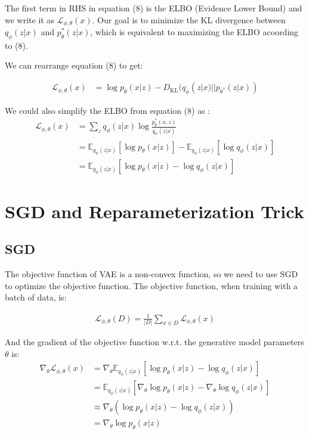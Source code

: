 \documentclass[11pt]{article}
\theoremstyle{definition}
\begin{document}
The first term in RHS in equation (8) is the ELBO (Evidence Lower Bound) and we write it as $\mathcal{L}_{\phi, \theta}(x)$. Our goal is to minimize the KL divergence between $q_\phi(z|x)$ and $p_\theta^*(z|x)$, which is equivalent to maximizing the ELBO acoording to (8).

We can rearrange equation (8) to get:

\begin{align}
    \mathcal{L}_{\phi, \theta}(x) &= \log p_\theta(x|z) - D_\text{KL}(q_\phi(z|x)||p_{\theta^*}(z|x))
\end{align}


We could also simplify the ELBO from equation (8) as :
\begin{align}
    \mathcal{L}_{\phi, \theta}(x) &=\sum_{z} q_\phi(z|x) \log \frac{p_\theta^*(x, z)}{q_\phi(z|x)}\\
    &= \mathbb{E}_{q_\phi(z|x)}[\log p_\theta(x|z)] - \mathbb{E}_{q_\phi(z|x)}[\log q_\phi(z|x)]\\
    &= \mathbb{E}_{q_\phi(z|x)}[\log p_\theta(x|z) - \log q_\phi(z|x)]
\end{align}


\section{SGD and Reparameterization Trick}

\subsection{SGD}

The objective function of VAE is a non-convex function, so we need to use SGD to optimize the objective function. The objective function, when training with a batch of data, is:

\begin{align}
    \mathcal{L}_{\phi, \theta}(D) = \frac{1}{|D|}\sum_{x \in D} \mathcal{L}_{\phi, \theta}(x)
\end{align}

And the gradient of the objective function w.r.t. the generative model parameters $\theta$ is:
\begin{align}
    \nabla_\theta \mathcal{L}_{\phi, \theta}(x) &= \nabla_\theta\mathbb{E}_{q_\phi(z|x)}[\log p_\theta(x|z) - \log q_\phi(z|x)]\\
    &= \mathbb{E}_{q_\phi(z|x)}[\nabla_\theta\log p_\theta(x|z) - \nabla_\theta\log q_\phi(z|x)]\\
    &\approx \nabla_\theta(\log p_\theta(x|z) - \log q_\phi(z|x))\\
    &= \nabla_\theta\log p_\theta(x|z)
\end{align}
\end{document}
